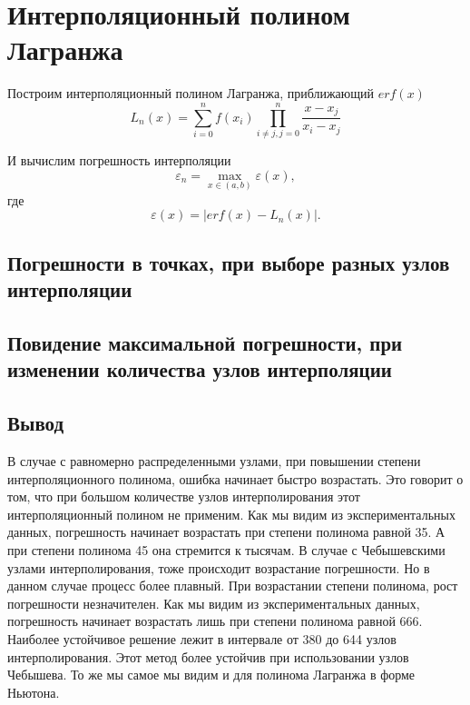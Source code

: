 \section{Интерполяционный полином Лагранжа}

Построим интерполяционный полином Лагранжа, приближающий $erf(x)$
$$
	L_n(x)=\sum\limits_{i=0}^{n}f(x_i)\prod\limits_{i \neq j, j = 0}^{n} \frac{x - x_j}{x_i-x_j}
$$

И вычислим погрешность интерполяции
$$
	\varepsilon_n = \max\limits_{x \in (a, b)} \varepsilon(x),
$$
где
$$
	\varepsilon(x)	= \left| erf(x) - L_n(x)\right|.
$$

\subsection{Погрешности в точках, при выборе разных узлов интерполяции}


\subsection{Повидение максимальной погрешности, при изменении количества узлов интерполяции}


\subsection{Вывод}

В случае с равномерно распределенными узлами, при повышении степени интерполяционного полинома, ошибка начинает быстро возрастать. Это говорит о том, что при большом количестве узлов интерполирования этот интерполяционный полином не применим. Как мы видим из экспериментальных данных, погрешность начинает возрастать при степени полинома равной 35. А при степени полинома 45 она стремится к тысячам. В случае с Чебышевскими узлами интерполирования, тоже происходит возрастание погрешности. Но в данном случае процесс более плавный. При возрастании степени полинома, рост погрешности незначителен. Как мы видим из экспериментальных данных, погрешность начинает возрастать лишь при степени полинома равной 666. Наиболее устойчивое решение лежит в интервале от 380 до 644 узлов интерполирования. Этот метод более устойчив при использовании узлов Чебышева. То же мы самое мы видим и для  полинома Лагранжа в форме Ньютона.